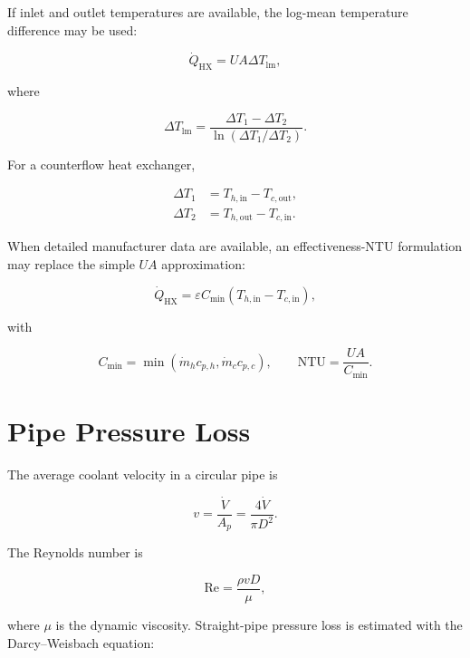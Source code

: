 \documentclass[11pt]{article}
\begin{document}
If inlet and outlet temperatures are available, the log-mean temperature difference
may be used:

\begin{equation}
\dot Q_{\mathrm{HX}}=UA\Delta T_{\mathrm{lm}},
\end{equation}

where

\begin{equation}
\Delta T_{\mathrm{lm}}
=\frac{\Delta T_1-\Delta T_2}
{\ln\left(\Delta T_1/\Delta T_2\right)}.
\end{equation}

For a counterflow heat exchanger,

\begin{align}
\Delta T_1&=T_{h,\mathrm{in}}-T_{c,\mathrm{out}},\\
\Delta T_2&=T_{h,\mathrm{out}}-T_{c,\mathrm{in}}.
\end{align}

When detailed manufacturer data are available, an effectiveness-NTU formulation may
replace the simple \(UA\) approximation:

\begin{equation}
\dot Q_{\mathrm{HX}}=\varepsilon C_{\min}
(T_{h,\mathrm{in}}-T_{c,\mathrm{in}}),
\end{equation}

with

\begin{equation}
C_{\min}=\min(\dot m_h c_{p,h},\dot m_c c_{p,c}),
\qquad
\mathrm{NTU}=\frac{UA}{C_{\min}}.
\end{equation}

\section{Pipe Pressure Loss}

The average coolant velocity in a circular pipe is

\begin{equation}
v=\frac{\dot V}{A_p}
=\frac{4\dot V}{\pi D^2}.
\end{equation}

The Reynolds number is

\begin{equation}
\mathrm{Re}=\frac{\rho vD}{\mu},
\end{equation}

where \(\mu\) is the dynamic viscosity. Straight-pipe pressure loss is estimated with
the Darcy--Weisbach equation:
\end{document}
